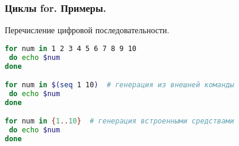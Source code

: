\begin{frame}[fragile]
\frametitle{ Циклы for. Примеры.}
  \begin{block}{Перечисление цифровой последовательности.}
\begin{lstlisting}[language=sh,frame=single]
for num in 1 2 3 4 5 6 7 8 9 10
 do echo $num
done

for num in $(seq 1 10)  # генерация из внешней команды
 do echo $num
done

for num in {1..10}  # генерация встроенными средствами
 do echo $num
done

\end{lstlisting}
  \end{block}
\end{frame}
